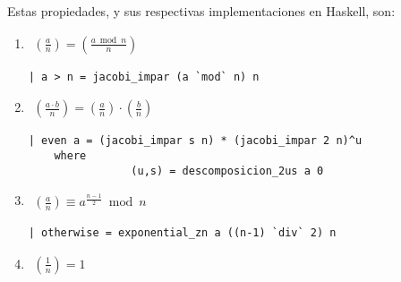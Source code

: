 \documentclass[10pt,spanish]{article}
\begin{document}
Estas propiedades, y sus respectivas implementaciones en Haskell, son:

\begin{enumerate}[1.]
\item 
\begin{equation*}
    \begin{aligned}
    \left( \frac{a}{n} \right) = \left( \frac{a \bmod n}{n} \right)
    \end{aligned}
    \phantom{\hspace{18cm}}
\end{equation*}

\begin{verbatim}
| a > n = jacobi_impar (a `mod` n) n 
\end{verbatim}

\item 
\begin{equation*}
    \begin{aligned}
    \left( \frac{a \cdot b}{n} \right) = \left( \frac{a}{n} \right) \cdot \left( \frac{b}{n} \right)
    \end{aligned}
    \phantom{\hspace{18cm}}
\end{equation*}

\begin{verbatim}
| even a = (jacobi_impar s n) * (jacobi_impar 2 n)^u
    where
                (u,s) = descomposicion_2us a 0

\end{verbatim}

\item
\begin{equation*}
    \begin{aligned}
    \left( \frac{a}{n} \right) \equiv a^{\frac{n-1}{2}} \bmod n
    \end{aligned}
    \phantom{\hspace{18cm}}
\end{equation*}

\begin{verbatim}
| otherwise = exponential_zn a ((n-1) `div` 2) n
\end{verbatim}

\item
\begin{equation*}
    \begin{aligned}
    \left( \frac{1}{n} \right) = 1
    \end{aligned}
    \phantom{\hspace{18cm}}
\end{equation*}


\end{enumerate}
\end{document}
